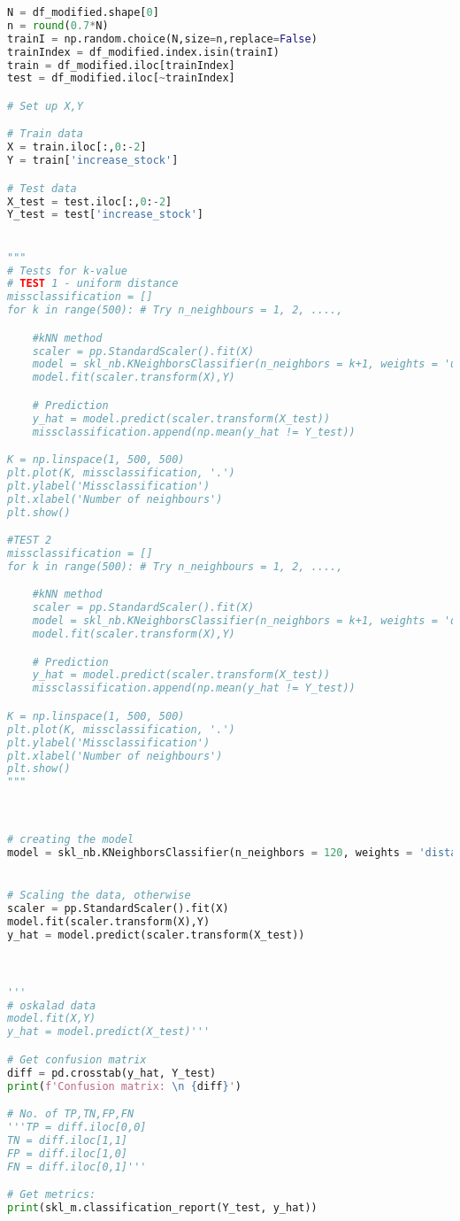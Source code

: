 \begin{lstlisting}[language = Python]
N = df_modified.shape[0]
n = round(0.7*N)
trainI = np.random.choice(N,size=n,replace=False)
trainIndex = df_modified.index.isin(trainI)
train = df_modified.iloc[trainIndex]
test = df_modified.iloc[~trainIndex]

# Set up X,Y

# Train data 
X = train.iloc[:,0:-2]
Y = train['increase_stock']

# Test data
X_test = test.iloc[:,0:-2]
Y_test = test['increase_stock']


"""
# Tests for k-value
# TEST 1 - uniform distance
missclassification = []
for k in range(500): # Try n_neighbours = 1, 2, ....,

    #kNN method
    scaler = pp.StandardScaler().fit(X)
    model = skl_nb.KNeighborsClassifier(n_neighbors = k+1, weights = 'uniform')
    model.fit(scaler.transform(X),Y)

    # Prediction
    y_hat = model.predict(scaler.transform(X_test))
    missclassification.append(np.mean(y_hat != Y_test))

K = np.linspace(1, 500, 500)
plt.plot(K, missclassification, '.')
plt.ylabel('Missclassification')
plt.xlabel('Number of neighbours')
plt.show()

#TEST 2
missclassification = []
for k in range(500): # Try n_neighbours = 1, 2, ....,

    #kNN method
    scaler = pp.StandardScaler().fit(X)
    model = skl_nb.KNeighborsClassifier(n_neighbors = k+1, weights = 'distance')
    model.fit(scaler.transform(X),Y)

    # Prediction
    y_hat = model.predict(scaler.transform(X_test))
    missclassification.append(np.mean(y_hat != Y_test))

K = np.linspace(1, 500, 500)
plt.plot(K, missclassification, '.')
plt.ylabel('Missclassification')
plt.xlabel('Number of neighbours')
plt.show()
"""



# creating the model
model = skl_nb.KNeighborsClassifier(n_neighbors = 120, weights = 'distance')


# Scaling the data, otherwise
scaler = pp.StandardScaler().fit(X)
model.fit(scaler.transform(X),Y)
y_hat = model.predict(scaler.transform(X_test))



'''
# oskalad data
model.fit(X,Y)
y_hat = model.predict(X_test)'''

# Get confusion matrix
diff = pd.crosstab(y_hat, Y_test)
print(f'Confusion matrix: \n {diff}')

# No. of TP,TN,FP,FN
'''TP = diff.iloc[0,0]
TN = diff.iloc[1,1]
FP = diff.iloc[1,0]
FN = diff.iloc[0,1]'''

# Get metrics:
print(skl_m.classification_report(Y_test, y_hat))
\end{lstlisting}




